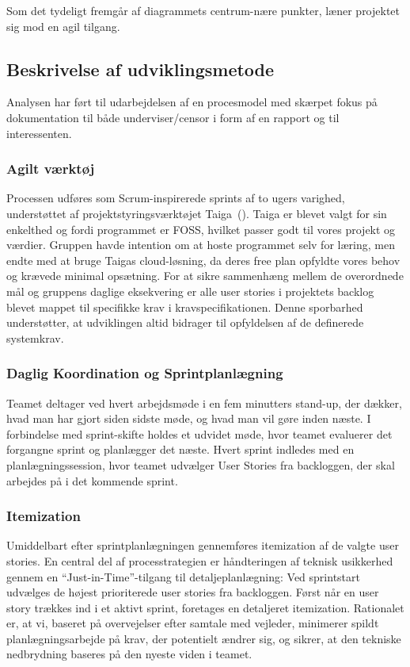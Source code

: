 Som det tydeligt fremgår af diagrammets centrum-nære punkter, læner projektet sig mod en agil tilgang.

\subsection{Beskrivelse af udviklingsmetode}

Analysen har ført til udarbejdelsen af en procesmodel med skærpet fokus på dokumentation til både underviser/censor i form af en rapport og til interessenten.

\subsubsection{Agilt værktøj}
Processen udføres som Scrum-inspirerede sprints af to ugers varighed, understøttet af projektstyringsværktøjet Taiga~(\cite{Taiga}).
Taiga er blevet valgt for sin enkelthed og fordi programmet er FOSS, hvilket passer godt til vores projekt og værdier. Gruppen havde intention om at hoste programmet selv for læring, men endte med at bruge Taigas cloud-løsning, da deres free plan opfyldte vores behov og krævede minimal opsætning.
For at sikre sammenhæng mellem de overordnede mål og gruppens daglige eksekvering er alle user stories i projektets backlog blevet mappet til specifikke krav i kravspecifikationen. Denne sporbarhed understøtter, at udviklingen altid bidrager til opfyldelsen af de definerede systemkrav.

\subsubsection{Daglig Koordination og Sprintplanlægning}
Teamet deltager ved hvert arbejdsmøde i en fem minutters stand-up, der dækker, hvad man har gjort siden sidste møde, og hvad man vil gøre inden næste.
I forbindelse med sprint-skifte holdes et udvidet møde, hvor teamet evaluerer det forgangne sprint og planlægger det næste. 
Hvert sprint indledes med en planlægningssession, hvor teamet udvælger User Stories fra backloggen, der skal arbejdes på i det kommende sprint.


\subsubsection{Itemization}
Umiddelbart efter sprintplanlægningen gennemføres itemization af de valgte user stories.
En central del af processtrategien er håndteringen af teknisk usikkerhed gennem en ``Just-in-Time''-tilgang til detaljeplanlægning:
Ved sprintstart udvælges de højest prioriterede user stories fra backloggen. Først når en user story trækkes ind i et aktivt sprint, foretages en detaljeret itemization.
Rationalet er, at vi, baseret på overvejelser efter samtale med vejleder, minimerer spildt planlægningsarbejde på krav, der potentielt ændrer sig, og sikrer, at den tekniske nedbrydning baseres på den nyeste viden i teamet.

